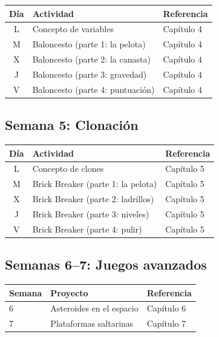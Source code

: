 \documentclass[11pt,a4paper]{article}
\begin{document}
\begin{center}
\renewcommand{\arraystretch}{1.3}
\begin{tabularx}{\linewidth}{c l X}
\toprule
\textbf{Día} & \textbf{Actividad} & \textbf{Referencia} \\
\midrule
L & Concepto de variables              & Capítulo 4 \\
M & Baloncesto (parte 1: la pelota)    & Capítulo 4 \\
X & Baloncesto (parte 2: la canasta)   & Capítulo 4 \\
J & Baloncesto (parte 3: gravedad)     & Capítulo 4 \\
V & Baloncesto (parte 4: puntuación)   & Capítulo 4 \\
\bottomrule
\end{tabularx}
\end{center}

\subsection{Semana 5: Clonación}

\begin{center}
\renewcommand{\arraystretch}{1.3}
\begin{tabularx}{\linewidth}{c l X}
\toprule
\textbf{Día} & \textbf{Actividad} & \textbf{Referencia} \\
\midrule
L & Concepto de clones                  & Capítulo 5 \\
M & Brick Breaker (parte 1: la pelota)  & Capítulo 5 \\
X & Brick Breaker (parte 2: ladrillos)  & Capítulo 5 \\
J & Brick Breaker (parte 3: niveles)    & Capítulo 5 \\
V & Brick Breaker (parte 4: pulir)      & Capítulo 5 \\
\bottomrule
\end{tabularx}
\end{center}

\subsection{Semanas 6--7: Juegos avanzados}

\begin{center}
\renewcommand{\arraystretch}{1.3}
\begin{tabularx}{\linewidth}{l l X}
\toprule
\textbf{Semana} & \textbf{Proyecto} & \textbf{Referencia} \\
\midrule
6 & Asteroides en el espacio     & Capítulo 6 \\
7 & Plataformas saltarinas       & Capítulo 7 \\
\bottomrule
\end{tabularx}
\end{center}
\end{document}
